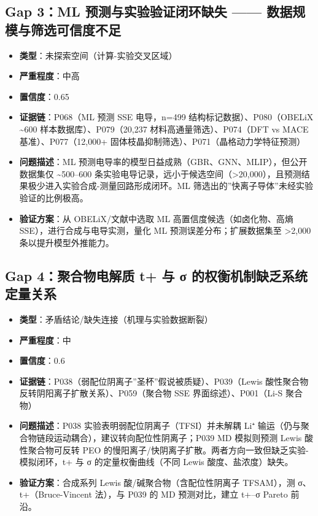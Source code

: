 \documentclass[12pt,a4paper]{ctexart}
\providecommand{\tightlist}{%
  \setlength{\itemsep}{0pt}\setlength{\parskip}{0pt}}
\begin{document}
\subsection{Gap 3：ML 预测与实验验证闭环缺失 ------ 数据规模与筛选可信度不足}\label{gap:gap-3ml-ux9884ux6d4bux4e0eux5b9eux9a8cux9a8cux8bc1ux95edux73afux7f3aux5931-ux6570ux636eux89c4ux6a21ux4e0eux7b5bux9009ux53efux4fe1ux5ea6ux4e0dux8db3}

\begin{itemize}
\tightlist
\item
  \textbf{类型}：未探索空间（计算-实验交叉区域）
\item
  \textbf{严重程度}：中高
\item
  \textbf{置信度}：0.65
\item
  \textbf{证据链}：P068（ML 预测 SSE 电导，n=499 结构标记数据）、P080（OBELiX \textasciitilde600 样本数据库）、P079（20,237 材料高通量筛选）、P074（DFT vs MACE 基准）、P077（12,000+ 固体枝晶抑制筛选）、P071（晶格动力学特征预测）
\item
  \textbf{问题描述}：ML 预测电导率的模型日益成熟（GBR、GNN、MLIP），但公开数据集仅 \textasciitilde500--600 条实验电导记录，远小于候选空间（\textgreater20,000），且预测结果极少进入实验合成-测量回路形成闭环。ML 筛选出的''快离子导体''未经实验验证的比例极高。
\item
  \textbf{验证方案}：从 OBELiX/文献中选取 ML 高置信度候选（如卤化物、高熵 SSE），进行合成与电导实测，量化 ML 预测误差分布；扩展数据集至 \textgreater2,000 条以提升模型外推能力。
\end{itemize}

\subsection{Gap 4：聚合物电解质 t+ 与 σ 的权衡机制缺乏系统定量关系}\label{gap:gap-4ux805aux5408ux7269ux7535ux89e3ux8d28-t-ux4e0e-ux3c3-ux7684ux6743ux8861ux673aux5236ux7f3aux4e4fux7cfbux7edfux5b9aux91cfux5173ux7cfb}

\begin{itemize}
\tightlist
\item
  \textbf{类型}：矛盾结论/缺失连接（机理与实验数据断裂）
\item
  \textbf{严重程度}：中
\item
  \textbf{置信度}：0.6
\item
  \textbf{证据链}：P038（弱配位阴离子''圣杯''假说被质疑）、P039（Lewis 酸性聚合物反转阴阳离子扩散关系）、P059（聚合物 SSE 界面综述）、P001（Li-S 聚合物）
\item
  \textbf{问题描述}：P038 实验表明弱配位阴离子（TFSI）并未解耦 Li⁺ 输运（仍与聚合物链段运动耦合），建议转向配位性阴离子；P039 MD 模拟则预测 Lewis 酸性聚合物可反转 PEO 的慢阳离子/快阴离子扩散。两者方向一致但缺乏实验-模拟闭环，t+ 与 σ 的定量权衡曲线（不同 Lewis 酸度、盐浓度）缺失。
\item
  \textbf{验证方案}：合成系列 Lewis 酸/碱聚合物（含配位性阴离子 TFSAM），测 σ、t+（Bruce-Vincent 法），与 P039 的 MD 预测对比，建立 t+--σ Pareto 前沿。
\end{itemize}
\end{document}
